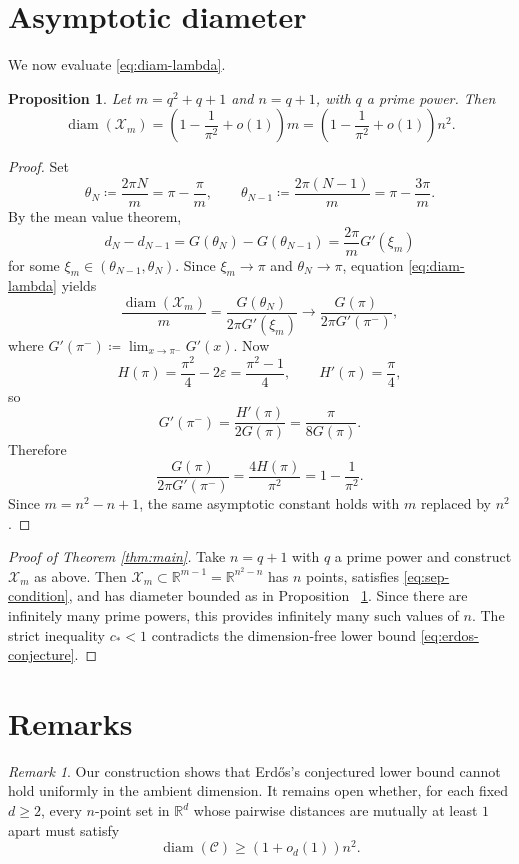 \documentclass[twoside, reqno, 12pt]{amsart}
\newtheorem{proposition}[theorem]{Proposition}
\theoremstyle{definition}
\theoremstyle{remark}
\newtheorem{remark}[theorem]{Remark}
\DeclareMathOperator{\diam}{diam}
\begin{document}
\section{Asymptotic diameter}

We now evaluate \eqref{eq:diam-lambda}.

\begin{proposition}\label{prop:asymptotic-diameter}
Let $m=q^2+q+1$ and $n=q+1$, with $q$ a prime power. Then
\[
\diam(\mathcal X_m)=\left(1-\frac{1}{\pi^2}+o(1)\right)m
=\left(1-\frac{1}{\pi^2}+o(1)\right)n^2.
\]
\end{proposition}

\begin{proof}
Set
\[
\theta_N\coloneqq\frac{2\pi N}{m}=\pi-\frac{\pi}{m},
\qquad
\theta_{N-1}\coloneqq\frac{2\pi(N-1)}{m}=\pi-\frac{3\pi}{m}.
\]
By the mean value theorem,
\[
 d_N-d_{N-1}=G(\theta_N)-G(\theta_{N-1})
 =\frac{2\pi}{m}G'(\xi_m)
\]
for some $\xi_m\in(\theta_{N-1},\theta_N)$. Since $\xi_m\to\pi$ and
$\theta_N\to\pi$, equation \eqref{eq:diam-lambda} yields
\[
\frac{\diam(\mathcal X_m)}{m}
=\frac{G(\theta_N)}{2\pi G'(\xi_m)}
\longrightarrow \frac{G(\pi)}{2\pi G'(\pi^-)},
\]
where $G'(\pi^-)\coloneqq\lim_{x\to\pi^-}G'(x)$. Now
\[
H(\pi)=\frac{\pi^2}{4}-2\varepsilon=\frac{\pi^2-1}{4},
\qquad
H'(\pi)=\frac{\pi}{4},
\]
so
\[
G'(\pi^-)=\frac{H'(\pi)}{2G(\pi)}=\frac{\pi}{8G(\pi)}.
\]
Therefore
\[
\frac{G(\pi)}{2\pi G'(\pi^-)}
=\frac{4H(\pi)}{\pi^2}
=1-\frac{1}{\pi^2}.
\]
Since $m=n^2-n+1$, the same asymptotic constant holds with $m$ replaced by
$n^2$.
\end{proof}

\begin{proof}[Proof of Theorem \ref{thm:main}]
Take $n=q+1$ with $q$ a prime power and construct $\mathcal X_m$ as above. Then
$\mathcal X_m\subset \mathbb R^{m-1}=\mathbb R^{n^2-n}$ has $n$ points,
satisfies \eqref{eq:sep-condition}, and has diameter bounded as in Proposition%
~\ref{prop:asymptotic-diameter}. Since there are infinitely many prime powers,
this provides infinitely many such values of $n$. The strict inequality
$c_*<1$ contradicts the dimension-free lower bound \eqref{eq:erdos-conjecture}.
\end{proof}

\section{Remarks}

\begin{remark}
Our construction shows that Erd\H{o}s's conjectured lower bound cannot hold
uniformly in the ambient dimension. It remains open whether, for each fixed
\(d\ge2\), every \(n\)-point set in \(\mathbb R^d\) whose pairwise distances
are mutually at least \(1\) apart must satisfy
\[
\diam(\mathcal C)\ge (1+o_d(1))n^2.
\]
\end{remark}
\end{document}
